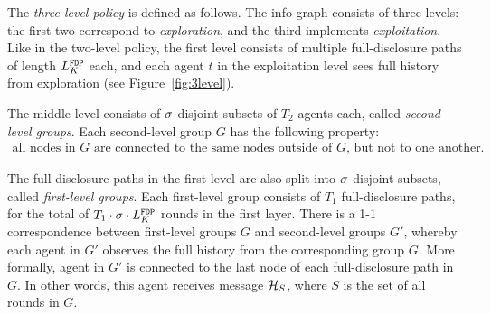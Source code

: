 \begin{construction}
The \emph{three-level policy} is defined as follows. The info-graph consists of three levels: the first two correspond to \emph{exploration}, and the third implements \emph{exploitation}. Like in the two-level policy, the first level consists of multiple full-disclosure paths of length $L^\mathtt{FDP}_K$ each, and each agent $t$ in the exploitation level sees full history from exploration  (see Figure~\ref{fig:3level}).

The middle level consists of $\sigma$ disjoint subsets of $T_2$ agents each, called \emph{second-level groups}. Each second-level group $G$ has the following property:
\begin{align}\label{eq:group-defn}
\text{all nodes in $G$ are connected to the same nodes outside of $G$, but not to one another.}
\end{align}


The full-disclosure paths in the first level are also split into $\sigma$ disjoint subsets, called \emph{first-level groups}. Each first-level group consists of $T_1$ full-disclosure paths, for the total of $T_1\cdot \sigma\cdot L^\mathtt{FDP}_K$ rounds in the first layer. There is a 1-1 correspondence between first-level groups $G$ and second-level groups $G'$, whereby each agent in $G'$ observes the full history from the corresponding group $G$. More formally, agent in $G'$ is connected to the last node of each full-disclosure path in $G$. In other words, this agent receives message
    $\mathcal{H}_{S}$,
where $S$ is the set of all rounds in $G$.
\end{construction}

